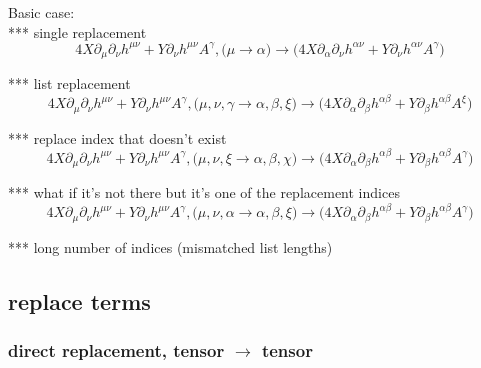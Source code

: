 \documentclass{article}
\def\){\Big)}
\def\({\Big(}
\begin{document}
Basic case:\\

*** single replacement
\begin{equation}
4X \partial_{\mu} \partial_{\nu}h^{\mu \nu} +Y \partial_{\nu}h^{\mu \nu} A^{\gamma} ,\( \mu \rightarrow \alpha \) \rightarrow 
\(4 X \partial_{\alpha}\partial_{\nu}h^{\alpha \nu} +Y \partial_{\nu}h^{\alpha \nu} A^{\gamma} \)
\end{equation}

*** list replacement
\begin{equation}
4X \partial_{\mu} \partial_{\nu}h^{\mu \nu} +Y \partial_{\nu}h^{\mu \nu} A^{\gamma} , \( \mu, \nu, \gamma \rightarrow \alpha, \beta, \xi \) \rightarrow 
 \(4 X \partial_{\alpha}\partial_{\beta}h^{\alpha \beta} +Y \partial_{\beta}h^{\alpha \beta} A^{\xi} \)
\end{equation}

*** replace index that doesn’t exist
\begin{equation}
4X \partial_{\mu} \partial_{\nu}h^{\mu \nu} +Y \partial_{\nu}h^{\mu \nu} A^{\gamma} , \( \mu, \nu, \xi \rightarrow \alpha, \beta, \chi \) \rightarrow 
\(4 X \partial_{\alpha}\partial_{\beta}h^{\alpha \beta} +Y \partial_{\beta}h^{\alpha \beta} A^{\gamma} \)
\end{equation}

*** what if it’s not there but it’s one of the replacement indices
\begin{equation}
4X \partial_{\mu} \partial_{\nu}h^{\mu \nu} +Y \partial_{\nu}h^{\mu \nu} A^{\gamma} , \( \mu, \nu, \alpha \rightarrow \alpha, \beta, \xi \) \rightarrow 
\(4 X \partial_{\alpha}\partial_{\beta}h^{\alpha \beta} +Y \partial_{\beta}h^{\alpha \beta} A^{\gamma} \)
\end{equation}

*** long number of indices (mismatched list lengths) 





\subsection{replace terms}

\subsubsection{direct replacement, tensor $\rightarrow$ tensor}
\end{document}
